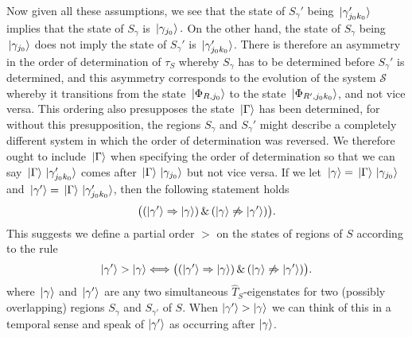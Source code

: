 Now given all these assumptions, we see that the state of $S_{\gamma}'$ being $\ket*{\gamma_{j_0k_0}'}$ implies that the state of $S_{\gamma}$ is $\ket*{\gamma_{j_0}}.$ On the other hand, the state of $S_{\gamma}$ being $\ket*{\gamma_{j_0}}$ does not imply the state of $S_{\gamma}'$ is $\ket*{\gamma_{j_0k_0}'}$. There is therefore an asymmetry in the order of determination of $\tau_S$ whereby $S_{\gamma}$ has to be determined before $S_{\gamma}'$ is determined, and this asymmetry corresponds to the evolution of the system $\mathcal{S}$ whereby it transitions from the state $\ket*{\Phi_{R,j_0}}$ to the state $\ket*{\Phi_{R',j_0k_0}}$, and not vice versa. This ordering also presupposes the state $\ket*{\Gamma}$ has been determined, for without this presupposition, the regions  $S_{\gamma}$ and $S_{\gamma}'$ might describe a completely different system in which the order of determination was reversed. We therefore ought to include $\ket*{\Gamma}$ when specifying the order of determination so that we can say $\ket*{\Gamma}\ket*{\gamma_{j_0k_0}'}$ comes after $\ket*{\Gamma}\ket*{\gamma_{j_0}}$ but not vice versa. If we let $\ket*{\gamma}=\ket*{\Gamma}\ket*{\gamma_{j_0}}$ and $\ket*{\gamma'}=\ket*{\Gamma}\ket*{\gamma_{j_0k_0}'}$, then the following statement holds
$$\big((\ket{\gamma'}\Rightarrow\ket{\gamma})\,\& \,(\ket{\gamma}\not\Rightarrow\ket{\gamma'})\big).$$
This suggests we define a partial order $>$ 
on the states of regions of $S$ according to the rule
\begin{equation}\label{timeordering}
\ket{\gamma'} > \ket{\gamma}
\Longleftrightarrow 
\big((\ket{\gamma'}\Rightarrow\ket{\gamma})\,\& \,(\ket{\gamma}\not\Rightarrow\ket{\gamma'})\big).
\end{equation}%
%
where $\ket*{\gamma}$ and $\ket*{\gamma'}$ are any two simultaneous $\hat{T}_S$-eigenstates for two (possibly overlapping) regions $S_\gamma$ and $S_{\gamma'}$ of $S$. When $\ket{\gamma'} > \ket{\gamma}$ we can think of this in a temporal sense and speak of $\ket{\gamma'}$ as occurring after $\ket{\gamma}$.


